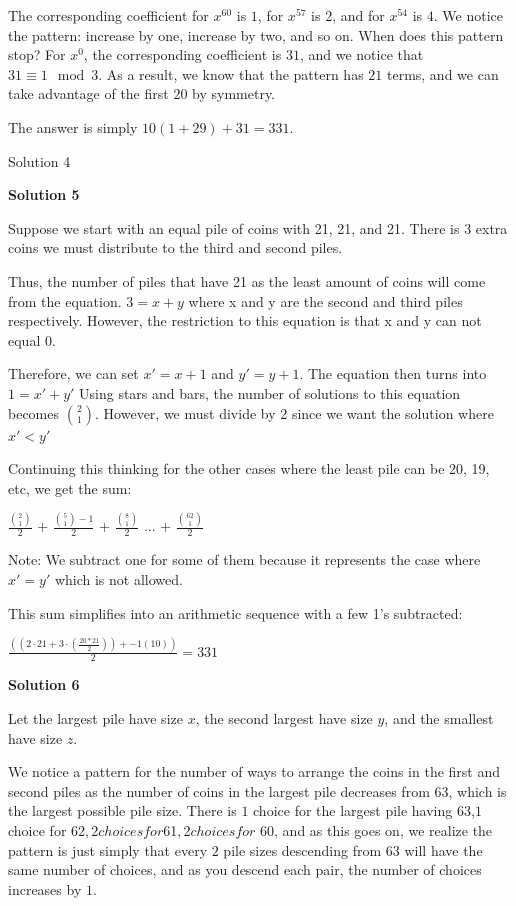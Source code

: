 \begin{enumerate}
 The corresponding coefficient for $x^{60}$ is $1$, for $x^{57}$ is $2$, and for $x^{54}$ is $4$. We notice the pattern: increase by one, increase by two, and so on. When does this pattern stop? For $x^0$, the corresponding coefficient is $31$, and we notice that $31\equiv1\mod3$. As a result, we know that the pattern has $21$ terms, and we can take advantage of the first $20$ by symmetry.

 The answer is simply $10(1+29)+31=\boxed{331}$.

 Solution 4

 



\textbf{Solution 5}

Suppose we start with an equal pile of coins with 21, 21, and 21. There is 3 extra coins we must distribute to the third and second piles.

 Thus, the number of piles that have 21 as the least amount of coins will come from the equation. $3 = x + y$ where x and y are the second and third piles respectively. However, the restriction to this equation is that x and y can not equal 0.

 Therefore, we can set $x' = x + 1$ and $y' = y + 1$. The equation then turns into $1 = x' + y'$ Using stars and bars, the number of solutions to this equation becomes $\binom{2}{1}$. However, we must divide by 2 since we want the solution where $x' < y'$

 Continuing this thinking for the other cases where the least pile can be 20, 19, etc, we get the sum:

 $\frac{\binom{2}{1}}{2}$ + $\frac{\binom{5}{1} - 1}{2}$ + $\frac{\binom{8}{1}}{2}$ ... + $\frac{\binom{62}{1}}{2}$

 Note: We subtract one for some of them because it represents the case where $x' = y'$ which is not allowed.

 This sum simplifies into an arithmetic sequence with a few 1's subtracted:

 $\frac{((2\cdot21 + 3\cdot(\frac{20*21}{2})) + -1(10))}{2} = \boxed{331}$




\textbf{Solution 6}

Let the largest pile have size $x$, the second largest have size $y$, and the smallest have size $z$.

 We notice a pattern for the number of ways to arrange the coins in the first and second piles as the number of coins in the largest pile decreases from $63$, which is the largest possible pile size. There is $1$ choice for the largest pile having $63$,$1$ choice for $62,2 choices for$61$,$2$choices for$ 60, and as this goes on, we realize the pattern is just simply that every $2$ pile sizes descending from $63$ will have the same number of choices, and as you descend each pair, the number of choices increases by $1$.


\end{enumerate}
